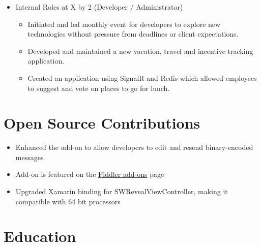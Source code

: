 \documentclass[12pt,letterpaper,sans]{moderncv}
\begin{document}
\begin{itemize}[leftmargin=1.24in]
\begin{itemize}
            \end{itemize}
        \item Internal Roles at X by 2 (Developer / Administrator)
            \begin{itemize}
            	\item Initiated and led monthly event for developers to explore new technologies without pressure from deadlines or client expectations.
                \item Developed and maintained a new vacation, travel and incentive tracking application.
                \item Created an application using SignalR and Redis which allowed employees to suggest and vote on places to go for lunch.
            \end{itemize}
    \end{itemize}
\section{Open Source Contributions}
	\begin{itemize}[leftmargin=1.24in]
		\item Enhanced the add-on to allow developers to edit and resend binary-encoded messages
		\item Add-on is featured on the \href{www.telerik.com/fiddler/add-ons}{Fiddler add-ons} page
	\end{itemize}
	\begin{itemize}[leftmargin=1.24in]
		\item Upgraded Xamarin binding for SWRevealViewController, making it compatible with 64 bit processors
	\end{itemize}


\section{Education}
\end{document}
